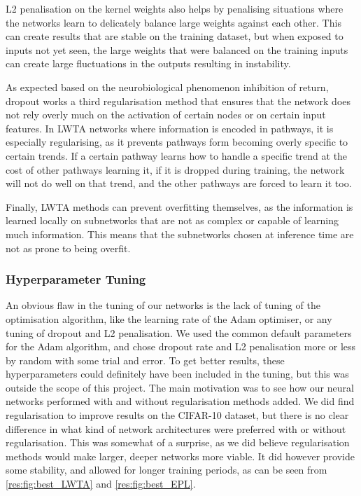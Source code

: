     L2 penalisation on the kernel weights also helps by penalising situations where the networks learn to delicately balance large weights against each other. This can create results that are stable on the training dataset, but when exposed to inputs not yet seen, the large weights that were balanced on the training inputs can create large fluctuations in the outputs resulting in instability.

    As expected based on the neurobiological phenomenon inhibition of return, dropout works a third regularisation method that ensures that the network does not rely overly much on the activation of certain nodes or on certain input features. In LWTA networks where information is encoded in pathways, it is especially regularising, as it prevents pathways form becoming overly specific to certain trends. If a certain pathway learns how to handle a specific trend at the cost of other pathways learning it, if it is dropped during training, the network will not do well on that trend, and the other pathways are forced to learn it too.

    Finally, LWTA methods can prevent overfitting themselves, as the information is learned locally on subnetworks that are not as complex or capable of learning much information. This means that the subnetworks chosen at inference time are not as prone to being overfit.



\subsubsection{Hyperparameter Tuning}
    An obvious flaw in the tuning of our networks is the lack of tuning of the optimisation algorithm, like the learning rate of the Adam optimiser, or any tuning of dropout and L2 penalisation. We used the common default parameters for the Adam algorithm, and chose dropout rate and L2 penalisation more or less by random with some trial and error. To get better results, these hyperparameters could definitely have been included in the tuning, but this was outside the scope of this project. The main motivation was to see how our neural networks performed with and without regularisation methods added.
    We did find regularisation to improve results on the CIFAR-10 dataset, but there is no clear difference in what kind of network architectures were preferred with or without regularisation. This was somewhat of a surprise, as we did believe regularisation methods would make larger, deeper networks more viable. It did however provide some stability, and allowed for longer training periods, as can be seen from \cref{res:fig:best_LWTA} and \cref{res:fig:best_EPL}.

